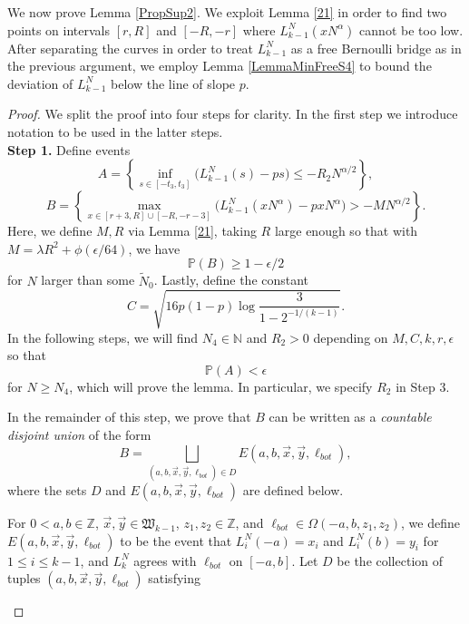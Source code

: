 	We now prove Lemma \ref{PropSup2}. We exploit Lemma \ref{21} in order to find two points on intervals $[r,R]$ and $[-R,-r]$ where $L_{k-1}^N(xN^\alpha)$ cannot be too low. After separating the curves in order to treat $L_{k-1}^N$ as a free Bernoulli bridge as in the previous argument, we employ Lemma \ref{LemmaMinFreeS4} to bound the deviation of $L_{k-1}^N$ below the line of slope $p$.
	
	\begin{proof} We split the proof into four steps for clarity. In the first step we introduce notation to be used in the latter steps.\\
	
	\noindent\textbf{Step 1.} Define events
		\[
		A = \left\{\inf_{s \in [ -t_3, t_3 ]}\big(L^N_{k-1}(s) - p s \big) \leq - R_2N^{\alpha/2}\right\},
		\]
		\[
		B = \left\{ \max_{x\in [r+3, R] \cup [-R,-r-3]} \big(L^N_{k-1}(xN^\alpha) - pxN^\alpha\big) > -MN^{\alpha/2} \right\}.
		\]
		Here, we define $M,R$ via Lemma \ref{21}, taking $R$ large enough so that with $M = \lambda R^2 + \phi(\epsilon/64)$, we have 
		\begin{equation}\label{4.3Bbound}
		\mathbb{P}(B) \geq 1 - \epsilon/2
		\end{equation} 
		for $N$ larger than some $\tilde{N}_0$.
		Lastly, define the constant
		\begin{equation}\label{4.3Cdef}
		C = \sqrt{16p(1-p)\log\frac{3}{1-2^{-1/(k-1)}}}.
		\end{equation}
		In the following steps, we will find $N_4\in\mathbb{N}$ and $R_2 > 0$ depending on $M,C,k,r,\epsilon$ so that 
		\begin{equation}\label{4.3Abound}
		\mathbb{P}(A) < \epsilon
		\end{equation}
		for $N\geq N_4$, which will prove the lemma. In particular, we specify $R_2$ in Step 3.
		
		In the remainder of this step, we prove that $B$ can be written as a \textit{countable disjoint union} of the form
		\begin{equation}\label{4.3disj}
		B = \bigsqcup_{(a,b,\vec{x},\vec{y},\ell_{bot})\in D} E(a,b,\vec{x},\vec{y},\ell_{bot}),
		\end{equation}
		where the sets $D$ and $E(a,b,\vec{x},\vec{y},\ell_{bot})$ are defined below.
		
		For $0<a,b\in\mathbb{Z}$, $\vec{x},\vec{y}\in\mathfrak{W}_{k-1}$, $z_1,z_2\in\mathbb{Z}$, and $\ell_{bot}\in\Omega(-a,b,z_1,z_2)$, we define $E(a,b,\vec{x},\vec{y},\ell_{bot})$ to be the event that $L_i^N(-a) = x_i$ and $L_i^N(b) = y_i$ for $1\leq i\leq k-1$, and $L_k^N$ agrees with $\ell_{bot}$ on $[-a,b]$. Let $D$ be the collection of tuples $(a,b,\vec{x},\vec{y},\ell_{bot})$ satisfying 
		\begin{enumerate}[label=(\arabic*)]
			

\end{enumerate}
\end{proof}

